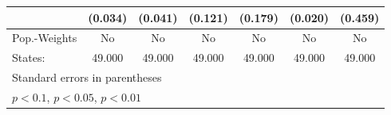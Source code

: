 {\begin{tabular}{l*{6}{c}}
            &     (0.034)         &     (0.041)         &     (0.121)         &     (0.179)         &     (0.020)         &     (0.459)         \\
\hline
Pop.-Weights&          No         &          No         &          No         &          No         &          No         &          No         \\
States:     &      49.000         &      49.000         &      49.000         &      49.000         &      49.000         &      49.000         \\
\hline\hline
\multicolumn{7}{l}{\footnotesize Standard errors in parentheses}\\
\multicolumn{7}{l}{\footnotesize \sym{*} \(p<0.1\), \sym{**} \(p<0.05\), \sym{***} \(p<0.01\)}\\
\end{tabular}
}
